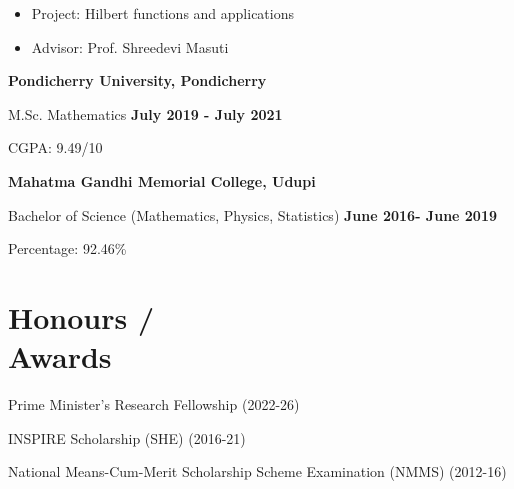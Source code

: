 \documentclass[margin,line,pifont,palatino,courier]{res}
\newenvironment{list1}{
  \begin{list}{\ding{113}}{%
      \setlength{\itemsep}{0in}
      \setlength{\parsep}{0in} \setlength{\parskip}{0in}
      \setlength{\topsep}{0in} \setlength{\partopsep}{0in}
      \setlength{\leftmargin}{0.17in}}}{\end{list}}
\newenvironment{list2}{
  \begin{list}{$\bullet$}{%
      \setlength{\itemsep}{0in}
      \setlength{\parsep}{0in} \setlength{\parskip}{0in}
      \setlength{\topsep}{0in} \setlength{\partopsep}{0in}
      \setlength{\leftmargin}{0.2in}}}{\end{list}}
\newcommand{\comment}[1]{}
\begin{document}
\begin{resume}
\begin{itemize}
\item Project: Hilbert functions and applications
\item Advisor: Prof. Shreedevi Masuti
\end{itemize}


{\bf Pondicherry University, Pondicherry}\\
\vspace*{-.1in}
\begin{list1}
\item[] M.Sc. Mathematics  \hfill \textbf{July 2019 - July 2021}

 \hspace{0.2cm} CGPA: 9.49/10
\comment{
\begin{list2}
\vspace*{.05in}
\end{list2} 
}

\end{list1}

{\bf Mahatma Gandhi Memorial College, Udupi}
\vspace*{-.1in}

\hspace{0.2cm} Bachelor of Science (Mathematics, Physics, Statistics) \hfill \textbf{ June 2016- June 2019}
\vspace{-.35cm}

\hspace{0.4cm} Percentage: 92.46\%
\section{\sc Honours / \\ Awards} 

Prime Minister's Research Fellowship (2022-26)

INSPIRE Scholarship (SHE) (2016-21)

National Means-Cum-Merit Scholarship Scheme Examination (NMMS) (2012-16)




\end{resume}
\end{document}
